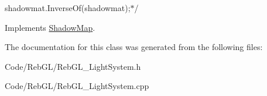 \begin{DoxyItemize}
\item shadowmat.\+Inverse\+Of(shadowmat);$\ast$/ 
\end{DoxyItemize}

Implements \hyperlink{class_shadow_map}{Shadow\+Map}.



The documentation for this class was generated from the following files\+:\begin{DoxyCompactItemize}
\item 
Code/\+Reb\+G\+L/Reb\+G\+L\+\_\+\+Light\+System.\+h\item 
Code/\+Reb\+G\+L/Reb\+G\+L\+\_\+\+Light\+System.\+cpp\end{DoxyCompactItemize}
